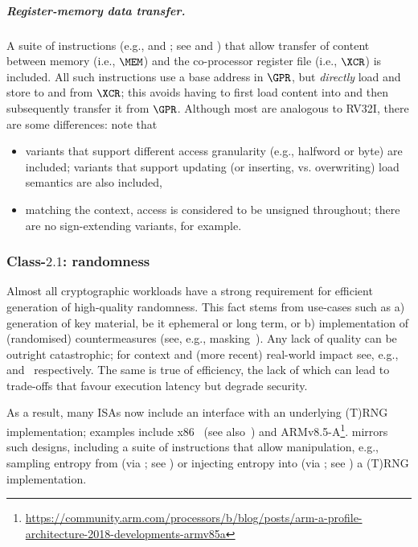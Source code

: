 \subparagraph{Register-memory   data transfer.}

A suite of instructions 
(e.g.,  and ; see  and )
that allow 
transfer of content between
   memory                         (i.e., $\MEM$)
and
the    co-processor register file (i.e., $\XCR$)
is included.
All such instructions use a base address in $\GPR$, but {\em directly} load 
and store to and from $\XCR$; this avoids having to first load content into 
and then subsequently transfer it from $\GPR$.
Although most are analogous to RV32I, there are some differences: note that

\begin{itemize}
\item variants that support different access granularity (e.g., halfword or
      byte) are included; variants that support updating (or inserting, vs. 
      overwriting) load semantics are also included,
\item matching the context, access is considered to be unsigned throughout;
      there are no sign-extending variants, for example.
\end{itemize}


\subsubsection{Class-$2.1$: randomness}
\label{sec:bg:feature:2:1}

Almost all cryptographic workloads have a strong requirement for efficient
generation of high-quality randomness.  This fact stems from use-cases such
as
a) generation of key material, be it ephemeral or long term,
   or
b) implementation of (randomised) countermeasures
   (see, e.g., masking~\cite[Chapter 9]{SCARV:ManOswPop:07}).
Any lack of quality can be outright catastrophic;
for context and (more recent) real-world impact see, e.g.,~\cite{SCARV:KSWH:98,SCARV:RFC:4086} and~\cite{SCARV:NSSKM:17} respectively.
The same is true of efficiency, the lack of which can lead to trade-offs 
that favour execution latency but degrade security.

As a result, many ISAs now include an interface with an underlying (T)RNG
implementation; examples include
x86~\cite[Section 7.3.17.1 and 7.3.17.2]{SCARV:X86:2:18} (see also~\cite{SCARV:JunKoc:99,SCARV:HamKocMar:12})
and
ARMv8.5-A\footnote{
\url{https://community.arm.com/processors/b/blog/posts/arm-a-profile-architecture-2018-developments-armv85a}
}.  \XCID mirrors such designs, including
a suite of instructions 
that allow 
manipulation, e.g.,
 sampling entropy from (via ; see )
or
injecting entropy into (via ; see )
a (T)RNG implementation.

